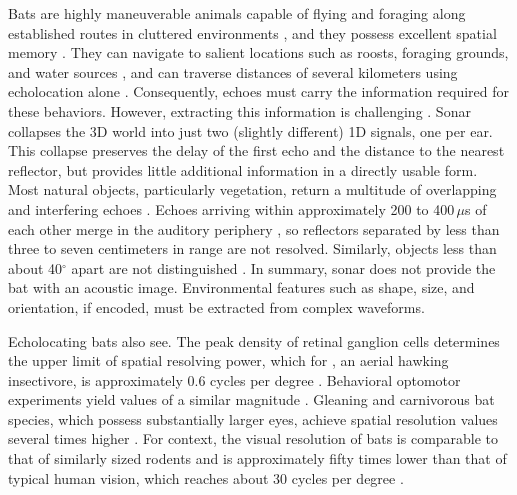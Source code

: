 \documentclass[11pt]{article}
\begin{document}
Bats are highly maneuverable animals capable of flying and foraging along established routes in cluttered environments \citep{Barchi2013,Petrites2009}, and they possess excellent spatial memory \citep{Barchi2013,Holland2007,Geva-Sagiv2015,Moehres1966,VonHelversen2005}. They can navigate to salient locations such as roosts, foraging grounds, and water sources \citep{Schnitzler2003,Helversen2003}, and can traverse distances of several kilometers using echolocation alone \citep{Goldshtein2024,Stones1969,Williams1966}. Consequently, echoes must carry the information required for these behaviors. However, extracting this information is challenging \citep[e.g.,][]{Vanderelst2015,Vanderelst2016,Steckel2013,Mansour2019,Mansour2019a}. Sonar collapses the 3D world into just two (slightly different) 1D signals, one per ear. This collapse preserves the delay of the first echo and the distance to the nearest reflector, but provides little additional information in a directly usable form. Most natural objects, particularly vegetation, return a multitude of overlapping and interfering echoes \citep{Yovel2009,Yovel2011,Vanderelst2016,Warnecke2018}. Echoes arriving within approximately 200 to 400\,$\mu$s of each other merge in the auditory periphery \citep{Simmons1989,Wiegrebe1996}, so reflectors separated by less than three to seven centimeters in range are not resolved. Similarly, objects less than about 40$^{\circ}$ apart are not distinguished \citep{Geberl2019}. In summary, sonar does not provide the bat with an acoustic image. Environmental features such as shape, size, and orientation, if encoded, must be extracted from complex waveforms.

Echolocating bats also see. The peak density of retinal ganglion cells determines the upper limit of spatial resolving power, which for , an aerial hawking insectivore, is approximately 0.6 cycles per degree \citep{Cechetto2020}. Behavioral optomotor experiments yield values of a similar magnitude \citep{Bell1986}.
Gleaning and carnivorous bat species, which possess substantially larger eyes, achieve spatial resolution values several times higher \citep{Pettigrew1988,Ekloef2014,Thiagavel2018}. For context, the visual resolution of bats is comparable to that of similarly sized rodents \citep{Veilleux2014,DeSousa2022} and is approximately fifty times lower than that of typical human vision, which reaches about 30 cycles per degree \citep{DeSousa2022}.
\end{document}
